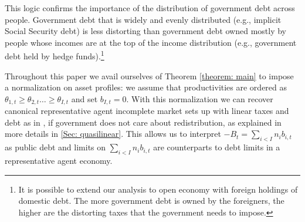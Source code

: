 \documentclass[thmsb,11pt]{article}
\begin{document}
This logic confirms the importance of  the distribution of government debt across people. Government debt that is widely and evenly distributed
(e.g., implicit Social Security debt) is less distorting than
 government debt owned mostly by people whose incomes are at the top of the income
distribution (e.g., government debt held by hedge funds).\footnote{%
It is possible to extend our analysis to open economy with foreign
holdings of domestic debt. The more government debt is owned by the
foreigners, the higher are the distorting taxes that  the government  needs to
impose.}
\color{black}
%

Throughout this paper we avail ourselves of Theorem \ref{theorem: main} to impose a normalization on  asset profiles:
we assume that productivities are ordered as  $\theta_{1,t}\geq\theta_{2,t}\ldots\geq \theta_{I,t}$ and set $b_{I,t}=0$. With this normalization we can recover canonical representative agent incomplete market sets up with linear taxes and debt as in \cite{Chari1999},\cite{Aiyagari2002} if government does not care about redistribution, as explained in more details in \ref{Sec: quasilinear}. This allows us to interpret $-B_t=\sum_{i<I}n_ib_{i,t}$ as
public debt and limits on $\sum_{i<I}n_ib_{i,t}$ are counterparts  to  debt limits in a representative agent economy. 
%
%
\end{document}

